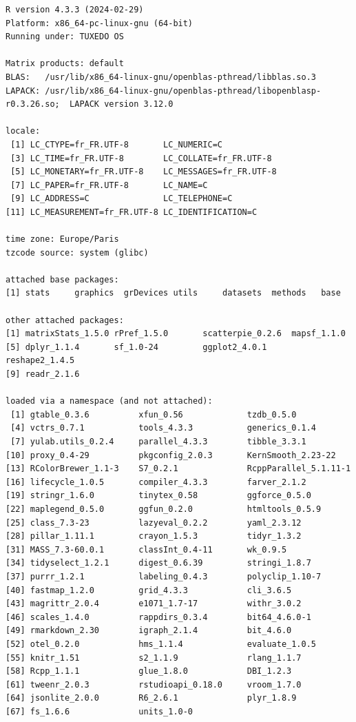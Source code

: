 \documentclass[
  french,
  11pt,
  a4paper,
]{article}
\begin{document}
\begin{verbatim}
R version 4.3.3 (2024-02-29)
Platform: x86_64-pc-linux-gnu (64-bit)
Running under: TUXEDO OS

Matrix products: default
BLAS:   /usr/lib/x86_64-linux-gnu/openblas-pthread/libblas.so.3 
LAPACK: /usr/lib/x86_64-linux-gnu/openblas-pthread/libopenblasp-r0.3.26.so;  LAPACK version 3.12.0

locale:
 [1] LC_CTYPE=fr_FR.UTF-8       LC_NUMERIC=C              
 [3] LC_TIME=fr_FR.UTF-8        LC_COLLATE=fr_FR.UTF-8    
 [5] LC_MONETARY=fr_FR.UTF-8    LC_MESSAGES=fr_FR.UTF-8   
 [7] LC_PAPER=fr_FR.UTF-8       LC_NAME=C                 
 [9] LC_ADDRESS=C               LC_TELEPHONE=C            
[11] LC_MEASUREMENT=fr_FR.UTF-8 LC_IDENTIFICATION=C       

time zone: Europe/Paris
tzcode source: system (glibc)

attached base packages:
[1] stats     graphics  grDevices utils     datasets  methods   base     

other attached packages:
[1] matrixStats_1.5.0 rPref_1.5.0       scatterpie_0.2.6  mapsf_1.1.0      
[5] dplyr_1.1.4       sf_1.0-24         ggplot2_4.0.1     reshape2_1.4.5   
[9] readr_2.1.6      

loaded via a namespace (and not attached):
 [1] gtable_0.3.6          xfun_0.56             tzdb_0.5.0           
 [4] vctrs_0.7.1           tools_4.3.3           generics_0.1.4       
 [7] yulab.utils_0.2.4     parallel_4.3.3        tibble_3.3.1         
[10] proxy_0.4-29          pkgconfig_2.0.3       KernSmooth_2.23-22   
[13] RColorBrewer_1.1-3    S7_0.2.1              RcppParallel_5.1.11-1
[16] lifecycle_1.0.5       compiler_4.3.3        farver_2.1.2         
[19] stringr_1.6.0         tinytex_0.58          ggforce_0.5.0        
[22] maplegend_0.5.0       ggfun_0.2.0           htmltools_0.5.9      
[25] class_7.3-23          lazyeval_0.2.2        yaml_2.3.12          
[28] pillar_1.11.1         crayon_1.5.3          tidyr_1.3.2          
[31] MASS_7.3-60.0.1       classInt_0.4-11       wk_0.9.5             
[34] tidyselect_1.2.1      digest_0.6.39         stringi_1.8.7        
[37] purrr_1.2.1           labeling_0.4.3        polyclip_1.10-7      
[40] fastmap_1.2.0         grid_4.3.3            cli_3.6.5            
[43] magrittr_2.0.4        e1071_1.7-17          withr_3.0.2          
[46] scales_1.4.0          rappdirs_0.3.4        bit64_4.6.0-1        
[49] rmarkdown_2.30        igraph_2.1.4          bit_4.6.0            
[52] otel_0.2.0            hms_1.1.4             evaluate_1.0.5       
[55] knitr_1.51            s2_1.1.9              rlang_1.1.7          
[58] Rcpp_1.1.1            glue_1.8.0            DBI_1.2.3            
[61] tweenr_2.0.3          rstudioapi_0.18.0     vroom_1.7.0          
[64] jsonlite_2.0.0        R6_2.6.1              plyr_1.8.9           
[67] fs_1.6.6              units_1.0-0          
\end{verbatim}
\end{document}
